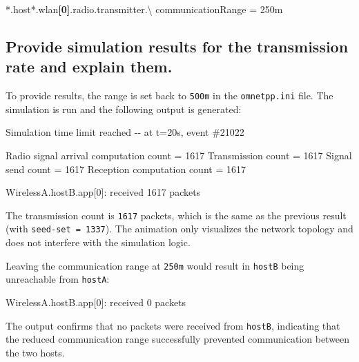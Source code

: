\documentclass[
  letterpaper,
  DIV=11,
  numbers=noendperiod]{scrartcl}
\newenvironment{Shaded}{\begin{snugshade}}{\end{snugshade}}
\newcommand{\DataTypeTok}[1]{\textcolor[rgb]{0.68,0.00,0.00}{#1}}
\newcommand{\KeywordTok}[1]{\textcolor[rgb]{0.00,0.23,0.31}{\textbf{#1}}}
\newcommand{\NormalTok}[1]{\textcolor[rgb]{0.00,0.23,0.31}{#1}}
\newcommand{\OtherTok}[1]{\textcolor[rgb]{0.00,0.23,0.31}{#1}}
\newcommand{\StringTok}[1]{\textcolor[rgb]{0.13,0.47,0.30}{#1}}
\begin{document}
\begin{Shaded}
\begin{Highlighting}[]
\DataTypeTok{*.host*.wlan}\KeywordTok{[0]}\DataTypeTok{.radio.transmitter.\textbackslash{}}
\DataTypeTok{  communicationRange }\OtherTok{=}\StringTok{ 250m}
\end{Highlighting}
\end{Shaded}

\subsection{Provide simulation results for the transmission rate and
explain
them.}\label{provide-simulation-results-for-the-transmission-rate-and-explain-them.}

To provide results, the range is set back to \texttt{500m} in the
\texttt{omnetpp.ini} file. The simulation is run and the following
output is generated:

\begin{Shaded}
\begin{Highlighting}[]
\NormalTok{Simulation time limit reached}
\NormalTok{  {-}{-} at t=20s, event \#21022}

\NormalTok{Radio signal}
\NormalTok{  arrival computation count = 1617}
\NormalTok{Transmission count = 1617}
\NormalTok{Signal send count = 1617}
\NormalTok{Reception computation count = 1617}

\NormalTok{WirelessA.hostB.app[0]:}
\NormalTok{  received 1617 packets}
\end{Highlighting}
\end{Shaded}

The transmission count is \texttt{1617} packets, which is the same as
the previous result (with \texttt{seed-set\ =\ 1337}). The animation
only visualizes the network topology and does not interfere with the
simulation logic.

Leaving the communication range at \texttt{250m} would result in
\texttt{hostB} being unreachable from \texttt{hostA}:

\begin{Shaded}
\begin{Highlighting}[]
\NormalTok{WirelessA.hostB.app[0]: received 0 packets}
\end{Highlighting}
\end{Shaded}

The output confirms that no packets were received from \texttt{hostB},
indicating that the reduced communication range successfully prevented
communication between the two hosts.
\end{document}
